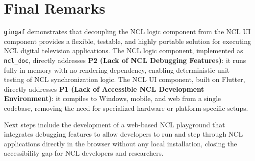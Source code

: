 \documentclass[sigconf]{acmart}
\newcommand{\projectname}{\texttt{gingaf}}
\begin{document}
\section{Final Remarks}

\projectname{} demonstrates that decoupling the NCL logic component from the NCL UI component provides a flexible, testable, and highly portable solution for executing NCL digital television applications. The NCL logic component, implemented as \texttt{ncl\_doc}, directly addresses \textbf{P2 (Lack of NCL Debugging Features)}: it runs fully in-memory with no rendering dependency, enabling deterministic unit testing of NCL synchronization logic. The NCL UI component, built on Flutter, directly addresses \textbf{P1 (Lack of Accessible NCL Development Environment)}: it compiles to Windows, mobile, and web from a single codebase, removing the need for specialized hardware or platform-specific setups.

Next steps include the development of a web-based NCL playground that integrates debugging features to allow developers to run and step through NCL applications directly in the browser without any local installation, closing the accessibility gap for NCL developers and researchers.




\appendix
\end{document}
